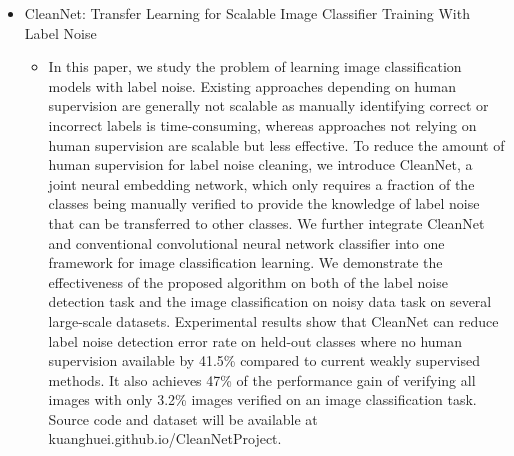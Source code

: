 \documentclass[12pt]{article}
\begin{document}
\begin{itemize}
\item CleanNet: Transfer Learning for Scalable Image Classifier Training
  With Label Noise \cite{Lee_2018_CVPR}
  \begin{itemize}
  \item In this paper, we study the problem of learning image
    classification models with label noise. Existing approaches
    depending on human supervision are generally not scalable as
    manually identifying correct or incorrect labels is time-consuming,
    whereas approaches not relying on human supervision are scalable but
    less effective. To reduce the amount of human supervision for label
    noise cleaning, we introduce CleanNet, a joint neural embedding network,
    which only requires a fraction of the classes being manually verified to
    provide the knowledge of label noise that can be transferred to other
    classes. We further integrate CleanNet and conventional convolutional
    neural network classifier into one framework for image classification
    learning. We demonstrate the effectiveness of the proposed algorithm on
    both of the label noise detection task and the image classification
    on noisy data task on several large-scale datasets. Experimental
    results show that CleanNet can reduce label noise detection error
    rate on held-out classes where no human supervision available by
    41.5\% compared to current weakly supervised methods. It also
    achieves 47\% of the performance gain of verifying all images with
    only 3.2\% images verified on an image classification task. Source
    code and dataset will be available at kuanghuei.github.io/CleanNetProject.
    \end{itemize}
  \end{itemize}






\end{document}
